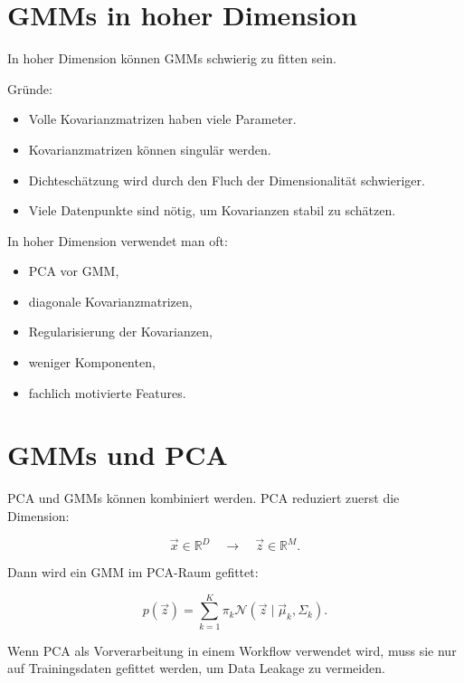 \section{GMMs in hoher Dimension}

In hoher Dimension können GMMs schwierig zu fitten sein.

Gründe:

\begin{itemize}
    \item Volle Kovarianzmatrizen haben viele Parameter.
    \item Kovarianzmatrizen können singulär werden.
    \item Dichteschätzung wird durch den Fluch der Dimensionalität schwieriger.
    \item Viele Datenpunkte sind nötig, um Kovarianzen stabil zu schätzen.
\end{itemize}

\begin{conceptbox}
In hoher Dimension verwendet man oft:

\begin{itemize}
    \item PCA vor GMM,
    \item diagonale Kovarianzmatrizen,
    \item Regularisierung der Kovarianzen,
    \item weniger Komponenten,
    \item fachlich motivierte Features.
\end{itemize}
\end{conceptbox}

\section{GMMs und PCA}

PCA und GMMs können kombiniert werden.
PCA reduziert zuerst die Dimension:

\[
    \vec{x}
    \in\mathbb{R}^D
    \quad
    \longrightarrow
    \quad
    \vec{z}
    \in\mathbb{R}^M.
\]

Dann wird ein GMM im PCA-Raum gefittet:

\[
    p(\vec{z})
    =
    \sum_{k=1}^{K}
    \pi_k
    \mathcal{N}(\vec{z}\mid\vec{\mu}_k,\Sigma_k).
\]

\begin{notebox}
Wenn PCA als Vorverarbeitung in einem Workflow verwendet wird, muss sie nur auf Trainingsdaten gefittet werden, um Data Leakage zu vermeiden.
\end{notebox}

